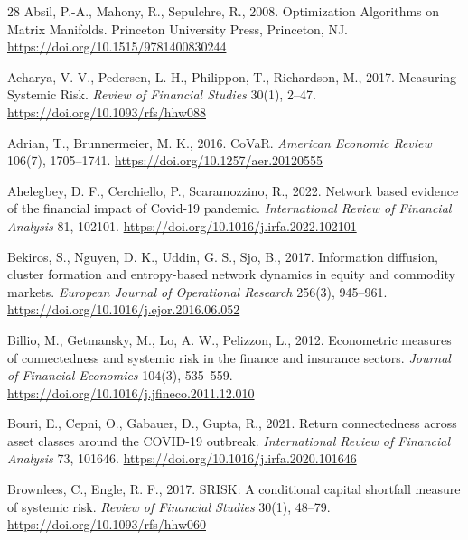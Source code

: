 \documentclass[12pt]{article}
\begin{document}
\begin{thebibliography}{28}
Absil, P.-A., Mahony, R., Sepulchre, R., 2008.
\newblock Optimization Algorithms on Matrix Manifolds.
\newblock Princeton University Press, Princeton, NJ. \url{https://doi.org/10.1515/9781400830244}

Acharya, V. V., Pedersen, L. H., Philippon, T., Richardson, M., 2017.
\newblock Measuring Systemic Risk.
\newblock \emph{Review of Financial Studies} 30(1), 2--47. \url{https://doi.org/10.1093/rfs/hhw088}

Adrian, T., Brunnermeier, M. K., 2016.
\newblock CoVaR.
\newblock \emph{American Economic Review} 106(7), 1705--1741. \url{https://doi.org/10.1257/aer.20120555}

Ahelegbey, D. F., Cerchiello, P., Scaramozzino, R., 2022.
\newblock Network based evidence of the financial impact of Covid-19 pandemic.
\newblock \emph{International Review of Financial Analysis} 81, 102101. \url{https://doi.org/10.1016/j.irfa.2022.102101}

Bekiros, S., Nguyen, D. K., Uddin, G. S., Sjo, B., 2017.
\newblock Information diffusion, cluster formation and entropy-based network dynamics in equity and commodity markets.
\newblock \emph{European Journal of Operational Research} 256(3), 945--961. \url{https://doi.org/10.1016/j.ejor.2016.06.052}

Billio, M., Getmansky, M., Lo, A. W., Pelizzon, L., 2012.
\newblock Econometric measures of connectedness and systemic risk in the finance and insurance sectors.
\newblock \emph{Journal of Financial Economics} 104(3), 535--559. \url{https://doi.org/10.1016/j.jfineco.2011.12.010}

Bouri, E., Cepni, O., Gabauer, D., Gupta, R., 2021.
\newblock Return connectedness across asset classes around the COVID-19 outbreak.
\newblock \emph{International Review of Financial Analysis} 73, 101646. \url{https://doi.org/10.1016/j.irfa.2020.101646}

Brownlees, C., Engle, R. F., 2017.
\newblock SRISK: A conditional capital shortfall measure of systemic risk.
\newblock \emph{Review of Financial Studies} 30(1), 48--79. \url{https://doi.org/10.1093/rfs/hhw060}


\end{thebibliography}
\end{document}
